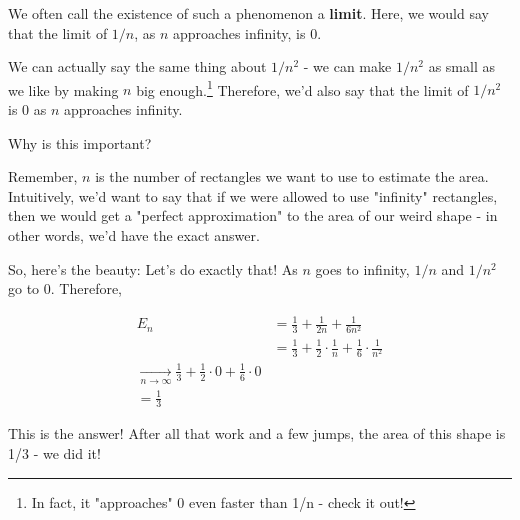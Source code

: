 \documentclass{article}
\begin{document}
We often call the existence of such a phenomenon a \textbf{limit}. Here, we would say that the limit of $1/n$, as $n$ approaches infinity, is 0. 

We can actually say the same thing about $1/n^2$ - we can make $1/n^2$ as small as we like by making $n$ big enough.\footnote{In fact, it "approaches" 0 even faster than 1/n - check it out!} Therefore, we'd also say that the limit of $1/n^2$ is 0 as $n$ approaches infinity.

Why is this important?


Remember, $n$ is the number of rectangles we want to use to estimate the area. Intuitively, we'd want to say that if we were allowed to use "infinity" rectangles, then we would get a "perfect approximation" to the area of our weird shape - in other words, we'd have the exact answer. 

So, here's the beauty: Let's do exactly that! As $n$ goes to infinity, $1/n$ and $1/n^2$ go to 0. Therefore, 

\begin{align*}
E_n &= \frac{1}{3} + \frac{1}{2n} + \frac{1}{6n^2} \\
&= \frac{1}{3} + \frac{1}{2} \cdot \frac{1}{n} + \frac{1}{6} \cdot \frac{1}{n^2} \\
\xrightarrow[n \to \infty]{} \frac{1}{3} + \frac{1}{2} \cdot 0 + \frac{1}{6} \cdot 0 \\
= \frac{1}{3}
\end{align*}


This is the answer! After all that work and a few jumps, the area of this shape is 1/3 - we did it!











\end{document}
